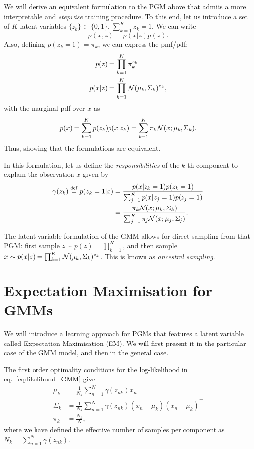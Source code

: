We will derive an equivalent formulation to the PGM above that admits a more interpretable and \emph{stepwise} training procedure. To this end,  let us introduce a set of $K$ latent variables $\{z_{k}\}\subset\{0,1\}$, $\sum_{k=1}^K z_{k} = 1$. We can write 
\begin{equation}
    p(x,z) = p(x|z)p(z).
\end{equation}
Also, defining $p(z_{k}=1) = \pi_k$, we can express the pmf/pdf: 
\begin{align}
    p(z) &= \prod_{k=1}^{K} \pi_k^{z_k}\\
    p(x|z) &= \prod_{k=1}^{K} {\mathcal N}(\mu_k,\Sigma_k)^{z_k},
\end{align}
with the marginal pdf over $x$ as 
\begin{equation}
    p(x) = \sum_{k=1}^{K} p(z_k)p(x|z_k)= \sum_{k=1}^{K} \pi_k {\mathcal N}(x; \mu_k,\Sigma_k).
\end{equation}
Thus, showing that the formulations are equivalent. 

In this formulation, let us define the \emph{responsibilities} of the $k$-th component to explain the observation $x$ given by
\begin{align}
    \gamma(z_k) \mathrel{\stackrel{\mathrm{def}}{=}} p(z_k = 1|x) 
    &= \frac{p(x|z_k=1)p(z_k=1)}{\sum_{j=1}^{K}p(x|z_j=1)p(z_j=1)}\\
    &= \frac{\pi_k {\mathcal N}(x; \mu_k,\Sigma_k)}{\sum_{j=1}^{K} \pi_j {\mathcal N}(x; \mu_j,\Sigma_j)}.
\end{align}

\begin{remark}
    The latent-variable formulation of the GMM allows for direct sampling from that PGM: first sample $z\sim p(z)=\prod_{k=1}^{K}$, and then sample $x\sim p(x|z)= \prod_{k=1}^{K} {\mathcal N}(\mu_k,\Sigma_k)^{z_k}$. This is known as \emph{ancestral sampling}.
\end{remark}


\section{Expectation Maximisation for GMMs}

We will introduce a learning approach for PGMs that features a latent variable called Expectation Maximisation (EM). We will first present it in the particular case of the GMM model, and then in the general case. 

The first order optimality conditions for the log-likelihood in eq.~\eqref{eq:likelihood_GMM} give
\begin{align}
    \mu_k &= \frac{1}{N_k} \sum_{n=1}^N \gamma(z_{nk})x_n\label{eq:GMM_LL_soln1}\\
    \Sigma_k & = \frac{1}{N_k} \sum_{n=1}^N \gamma(z_{nk})(x_n - \mu_k)(x_n - \mu_k)^\top\label{eq:GMM_LL_soln2}\\
    \pi_k &= \frac{N_k}{N},\label{eq:GMM_LL_soln3}
\end{align}
where we have defined the effective number of samples per component as $N_k = \sum_{n=1}^N \gamma(z_{nk})$.

